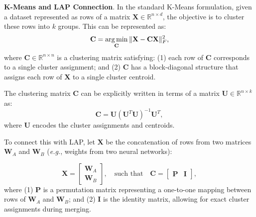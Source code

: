 \documentclass{article}
\newcommand{\eg}{\emph{e.g.},\xspace}
\newcommand\fakeparagraph[1]{\par\noindent\textbf{{#1}}.\xspace}
\begin{document}
{\fakeparagraph{K-Means and LAP Connection} In the standard K-Means formulation, given a dataset represented as rows of a matrix $\mathbf{X} \in \mathbb{R}^{n \times d}$, the objective is to cluster these rows into $k$ groups. This can be represented as:
\begin{equation}
    \mathbf{C} = \operatorname*{arg\,min}_{\mathbf{C}} \|\mathbf{X} - \mathbf{C}\mathbf{X}\|_F^2,
    \label{eq:4}
\end{equation}
where $\mathbf{C} \in \mathbb{R}^{n \times n}$ is a clustering matrix satisfying: (1) each row of $\mathbf{C}$ corresponds to a single cluster assignment; and (2)  $\mathbf{C}$ has a block-diagonal structure that assigns each row of $\mathbf{X}$ to a single cluster centroid.

The clustering matrix $\mathbf{C}$ can be explicitly written in terms of a matrix $\mathbf{U} \in \mathbb{R}^{n \times k}$ as:
\begin{equation*}
    \mathbf{C} = \mathbf{U} (\mathbf{U}^T \mathbf{U})^{-1} \mathbf{U}^T,
\end{equation*}
where $\mathbf{U}$ encodes the cluster assignments and centroids.

To connect this with LAP, let $\mathbf{X}$ be the concatenation of rows from two matrices $\mathbf{W}_A$ and $\mathbf{W}_B$ (\eg weights from two neural networks):

\begin{equation*}
    \mathbf{X} = \begin{bmatrix} \mathbf{W}_A \\ \mathbf{W}_B \end{bmatrix}, \quad \text{such that} \quad 
    \mathbf{C} = \begin{bmatrix} \mathbf{P} & \mathbf{I} \end{bmatrix},
\end{equation*}
where (1) $\mathbf{P}$ is a permutation matrix representing a one-to-one mapping between rows of $\mathbf{W}_A$ and $\mathbf{W}_B$; and (2) $\mathbf{I}$ is the identity matrix, allowing for exact cluster assignments during merging.

}
\end{document}
